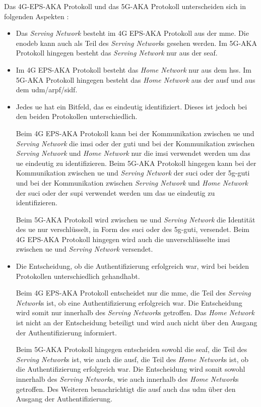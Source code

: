Das 4G-EPS-AKA Protokoll und das 5G-AKA Protokoll unterscheiden sich in folgenden Aspekten \cite{Compare}: 

\begin{itemize}
\item Das \textit{Serving Network} besteht im 4G EPS-AKA Protokoll aus der \gls{mme}. 
Die \gls{enodeb} kann auch als Teil des \textit{Serving Network}s gesehen werden.
Im 5G-AKA Protokoll hingegen besteht das \textit{Serving Network} nur aus der \gls{seaf}.

\item Im 4G EPS-AKA Protokoll besteht das \textit{Home Network} nur aus dem \gls{hss}.
Im 5G-AKA Protokoll hingegen besteht das \textit{Home Network} aus der \gls{ausf} und aus dem \gls{udm}/\gls{arpf}/\gls{sidf}.

\item Jedes \gls{ue} hat ein Bitfeld, das es eindeutig identifiziert.
Dieses ist jedoch bei den beiden Protokollen unterschiedlich.

Beim 4G EPS-AKA Protokoll kann bei der Kommunikation zwischen \gls{ue} und \textit{Serving Network} die \gls{imsi} oder der \gls{guti} und bei der Kommunikation zwischen \textit{Serving Network} und \textit{Home Network} nur die \gls{imsi} verwendet werden um das \gls{ue} eindeutig zu identifizieren.
Beim 5G-AKA Protokoll hingegen kann bei der Kommunikation zwischen \gls{ue} und \textit{Serving Network} der \gls{suci} oder der \gls{5g-guti} und bei der Kommunikation zwischen \textit{Serving Network} und \textit{Home Network} der \gls{suci} oder der \gls{supi} verwendet werden um das \gls{ue} eindeutig zu identifizieren.

Beim 5G-AKA Protokoll wird zwischen \gls{ue} und \textit{Serving Network} die Identität des \gls{ue} nur verschlüsselt, in Form des \gls{suci} oder des \gls{5g-guti}, versendet. Beim 4G EPS-AKA Protokoll hingegen wird auch die unverschlüsselte \gls{imsi} zwischen \gls{ue} und \textit{Serving Network} versendet.

\item Die Entscheidung, ob die Authentifizierung erfolgreich war, wird bei beiden Protokollen unterschiedlich gehandhabt.

Beim 4G EPS-AKA Protokoll entscheidet nur die \gls{mme}, die Teil des \textit{Serving Network}s ist, ob eine Authentifizierung erfolgreich war.
Die Entscheidung wird somit nur innerhalb des \textit{Serving Network}s getroffen.
Das \textit{Home Network} ist nicht an der Entscheidung beteiligt und wird auch nicht über den Ausgang der Authentifizierung informiert.

Beim 5G-AKA Protokoll hingegen entscheiden sowohl die \gls{seaf}, die Teil des \textit{Serving Network}s ist, wie auch die \gls{ausf}, die Teil des \textit{Home Network}s ist, ob die Authentifizierung erfolgreich war.
Die Entscheidung wird somit sowohl innerhalb des \textit{Serving Network}s, wie auch innerhalb des \textit{Home Network}s getroffen.
Des Weiteren benachrichtigt die \gls{ausf} auch das \gls{udm} über den Ausgang der Authentifizierung.
\end{itemize}




